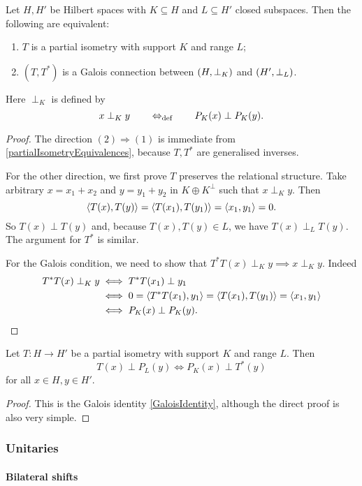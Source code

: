 \begin{proposition}
Let $H,H'$ be Hilbert spaces with $K\subseteq H$ and $L\subseteq H'$ closed subspaces. Then the following are equivalent:
\begin{enumerate}
\item $T$ is a partial isometry with support $K$ and range $L$;
\item $(T,T^*)$ is a Galois connection between $\left( H, \perp_K \right)$ and $\left( H', \perp_L \right)$.
\end{enumerate}
Here $\perp_K$ is defined by
\[ x \perp_K y \quad\quad\Leftrightarrow_{\text{def}}\quad\quad P_K(x)\perp P_{K}(y). \]
\end{proposition}
\begin{proof}
The direction $(2) \Rightarrow (1)$ is immediate from \ref{partialIsometryEquivalences}, because $T,T^*$ are generalised inverses.

For the other direction, we first prove $T$ preserves the relational structure. Take arbitrary $x= x_1+x_2$ and $y=y_1+y_2$ in $K\oplus K^\perp$ such that $x\perp_K y$. Then
\[ \left\langle T(x), T(y) \right\rangle = \left\langle T(x_1), T(y_1) \right\rangle = \left\langle x_1, y_1 \right\rangle = 0. \]
So $T(x)\perp T(y)$ and, because $T(x), T(y) \in L$, we have $T(x)\perp_L T(y)$. The argument for $T^*$ is similar.

For the Galois condition, we need to show that $T^*T(x)\perp_K y \implies x\perp_K y$. Indeed
\begin{align*}
T^*T(x)\perp_K y &\iff T^*T(x_1)\perp y_1 \\
&\iff 0= \left\langle T^*T(x_1), y_1 \right\rangle = \left\langle T(x_1), T(y_1) \right\rangle = \left\langle x_1,y_1 \right\rangle \\
&\iff P_K(x)\perp P_K(y).
\end{align*}
\end{proof}
\begin{corollary}
Let $T: H\to H'$ be a partial isometry with support $K$ and range $L$. Then
\[ T(x) \perp P_L(y) \iff P_K(x) \perp T^*(y) \]
for all $x\in H, y\in H'$.
\end{corollary}
\begin{proof}
This is the Galois identity \ref{GaloisIdentity}, although the direct proof is also very simple.
\end{proof}

\subsubsection{Unitaries}
\paragraph{Bilateral shifts}

